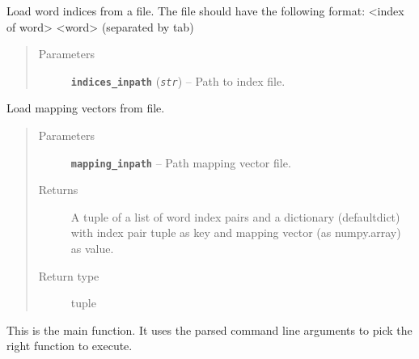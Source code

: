 \documentclass[letterpaper,10pt,english]{sphinxmanual}
\begin{document}
\begin{fulllineitems}
\label{src.clustering:src.clustering.cluster_mappings.load_indices}
Load word indices from a file. The file should have the following format: \textless{}index of word\textgreater{}       \textless{}word\textgreater{} (separated by
tab)
\begin{quote}\begin{description}
\item[{Parameters}] \leavevmode
\textbf{\texttt{indices\_inpath}} (\emph{\texttt{str}}) -- Path to index file.

\end{description}\end{quote}

\end{fulllineitems}


\begin{fulllineitems}
\label{src.clustering:src.clustering.cluster_mappings.load_mappings_from_model}
Load mapping vectors from file.
\begin{quote}\begin{description}
\item[{Parameters}] \leavevmode
\textbf{\texttt{mapping\_inpath}} -- Path mapping vector file.

\item[{Returns}] \leavevmode
A tuple of a list of word index pairs and a dictionary (defaultdict) with index pair tuple as key
and mapping vector (as numpy.array) as value.

\item[{Return type}] \leavevmode
tuple

\end{description}\end{quote}

\end{fulllineitems}


\begin{fulllineitems}
\label{src.clustering:src.clustering.cluster_mappings.main}
This is the main function. It uses the parsed command line arguments to pick the right function to execute.

\end{fulllineitems}
\end{document}
